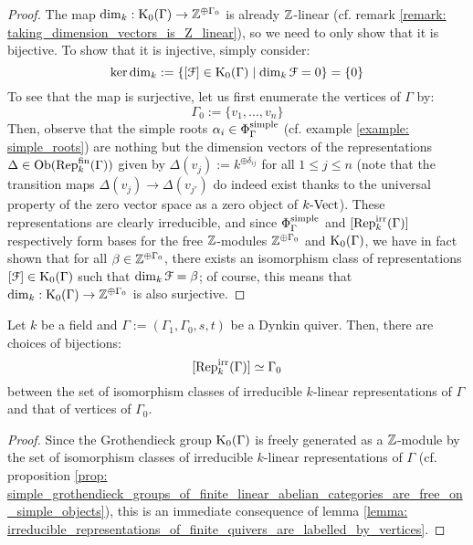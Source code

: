                 \begin{proof}
                    The map $\dim_k: \mathrm{K}_0(\Gamma) \to \mathbb{Z}^{\oplus \Gamma_0}$ is already $\mathbb{Z}$-linear (cf. remark \ref{remark: taking_dimension_vectors_is_Z_linear}), so we need to only show that it is bijective. To show that it is injective, simply consider:
                        $$\ker \dim_k := \{[\mathcal{F}] \in \mathrm{K}_0(\Gamma) \mid \dim_k \mathcal{F} = 0\} = \{0\}$$
                    To see that the map is surjective, let us first enumerate the vertices of $\Gamma$ by:
                        $$\Gamma_0 := \{v_1, ..., v_n\}$$
                    Then, observe that the simple roots $\alpha_i \in \Phi_{\Gamma}^{\mathrm{simple}}$ (cf. example \ref{example: simple_roots}) are nothing but the dimension vectors of the representations $\Delta \in \mathrm{Ob}(\mathrm{Rep}_k^{\mathrm{fin}}(\Gamma))$ given by $\Delta(v_j) := k^{\oplus \delta_{ij}}$ for all $1 \leq j \leq n$ (note that the transition maps $\Delta(v_j) \to \Delta(v_{j'})$ do indeed exist thanks to the universal property of the zero vector space as a zero object of $k\text{-}\mathrm{Vect}$). These representations are clearly irreducible, and since $\Phi_{\Gamma}^{\mathrm{simple}}$ and $[\mathrm{Rep}_k^{\mathrm{irr}}(\Gamma)]$ respectively form bases for the free $\mathbb{Z}$-modules $\mathbb{Z}^{\oplus \Gamma_0}$ and $\mathrm{K}_0(\Gamma)$, we have in fact shown that for all $\beta \in \mathbb{Z}^{\oplus \Gamma_0}$, there exists an isomorphism class of representations $[\mathcal{F}] \in \mathrm{K}_0(\Gamma)$ such that $\dim_k \mathcal{F} = \beta$; of course, this means that $\dim_k: \mathrm{K}_0(\Gamma) \to \mathbb{Z}^{\oplus \Gamma_0}$ is also surjective.
                \end{proof}
            \begin{corollary} \label{coro: irreducible_representations_of_finite_quivers_are_labelled_by_vertices}
                Let $k$ be a field and $\Gamma := (\Gamma_1, \Gamma_0, s, t)$ be a Dynkin quiver. Then, there are choices of bijections:
                    $$[\mathrm{Rep}_k^{\mathrm{irr}}(\Gamma)] \simeq \Gamma_0$$
                between the set of isomorphism classes of irreducible $k$-linear representations of $\Gamma$ and that of vertices of $\Gamma_0$.
            \end{corollary}
                \begin{proof}
                    Since the Grothendieck group $\mathrm{K}_0(\Gamma)$ is freely generated as a $\mathbb{Z}$-module by the set of isomorphism classes of irreducible $k$-linear representations of $\Gamma$ (cf. proposition \ref{prop: simple_grothendieck_groups_of_finite_linear_abelian_categories_are_free_on_simple_objects}), this is an immediate consequence of lemma \ref{lemma: irreducible_representations_of_finite_quivers_are_labelled_by_vertices}.
                \end{proof}
